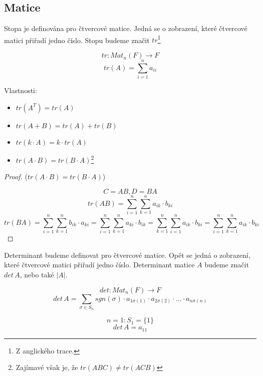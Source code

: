 \subsection{Matice}

\begin{definition}[Stopa]
    Stopa je definována pro čtvercové matice. Jedná se o zobrazení,
    které čtvercové matici přiřadí jedno číslo. Stopu budeme značit
    $tr$\footnote{Z anglického trace.}

    $$tr: Mat_n(F) \rightarrow F$$
    $$tr(A) = \sum_{i=1}^na_{ii}$$

    Vlastnosti:
    \begin{itemize}
        \item $tr(A^T) = tr(A)$
        \item $tr(A + B) = tr(A) + tr(B)$
        \item $tr(k \cdot A) = k \cdot tr(A)$
        \item $tr(A\cdot B) = tr(B \cdot A)$\footnote{Zajímavé však je, že
        $tr(ABC) \neq tr(ACB)$}
    \end{itemize}

\end{definition}
\begin{proof}
    ($tr(A\cdot B) = tr(B \cdot A)$)

    $$C = AB, D = BA$$
    $$tr(AB) = \sum_{i=1}^n\sum_{k=1}^n a_{ik} \cdot b_{ki}$$
    $$tr(BA) = \sum_{i=1}^n\sum_{k=1}^n b_{ik} \cdot a_{ki} = \sum_{i=1}^n\sum_{k=1}^n a_{ki}
    \cdot b_{ik} = \sum_{k=1}^n\sum_{i=1}^n a_{ik} \cdot b_{ki} =
    \sum_{i=1}^n\sum_{k=1}^n a_{ik} \cdot b_{ki}$$

\end{proof}

\begin{definition}[Determinant]
    Determinant budeme definovat pro čtvercové matice.
    Opět se jedná o zobrazení, které čtvercové matici přiřadí
    jedno číslo. Determinant matice $A$ budeme značit $det\,A$, nebo také $|A|$.

    $$det: Mat_n(F) \rightarrow F$$
    $$det\, A = \sum_{\sigma \in S_n} sgn(\sigma) \cdot a_{1\sigma(1)} \cdot a_{2\sigma(2)}
    \cdot \ldots \cdot a_{n\sigma(n)}$$
\end{definition}

\begin{example}
    $$n = 1: S_1=\{1\}$$
    $$det\,A = a_{11}$$
\end{example}

